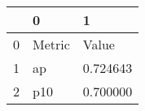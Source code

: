 \begin{tabular}{lll}
\toprule
 & 0 & 1 \\
\midrule
0 & Metric & Value \\
1 & ap & 0.724643 \\
2 & p10 & 0.700000 \\
\bottomrule
\end{tabular}
